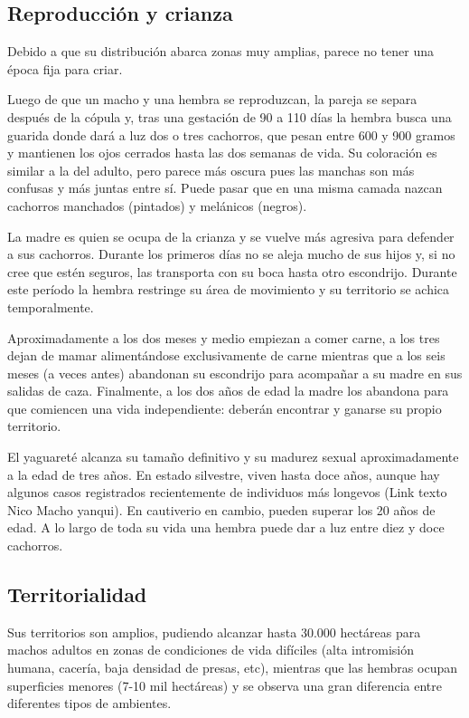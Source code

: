 \documentclass{article}
\begin{document}
    \subsection{Reproducción y crianza}
    Debido a que su distribución abarca zonas muy amplias, parece no tener una época fija para criar.
    
    Luego de que un macho y una hembra se reproduzcan, la pareja se separa después de la cópula y, tras una gestación de 90 a 110 días la hembra busca una guarida donde dará a luz dos o tres cachorros, que pesan entre 600 y 900 gramos y mantienen los ojos cerrados hasta las dos semanas de vida. Su coloración es similar a la del adulto, pero parece más oscura pues las manchas son más confusas y más juntas entre sí. Puede pasar que en una misma camada nazcan cachorros manchados (pintados) y melánicos (negros).
    
    La madre es quien se ocupa de la crianza y se vuelve más agresiva para defender a sus cachorros. Durante los primeros días no se aleja mucho de sus hijos y, si no cree que estén seguros, las transporta con su boca hasta otro escondrijo. Durante este período la hembra restringe su área de movimiento y su territorio se achica temporalmente.
    
    Aproximadamente a los dos meses y medio empiezan a comer carne, a los tres dejan de mamar alimentándose exclusivamente de carne mientras que a los seis meses (a veces antes) abandonan su escondrijo para acompañar a su madre en sus salidas de caza. Finalmente, a los dos años de edad la madre los abandona para que comiencen una vida independiente: deberán encontrar y ganarse su propio territorio.
    
    El yaguareté alcanza su tamaño definitivo y su madurez sexual aproximadamente a la edad de tres años. En estado silvestre, viven hasta doce años, aunque hay algunos casos registrados recientemente de individuos más longevos (Link texto Nico Macho yanqui). En cautiverio en cambio, pueden superar los 20 años de edad. A lo largo de toda su vida una hembra puede dar a luz entre diez y doce cachorros.

    \subsection{Territorialidad}
    Sus territorios son amplios, pudiendo alcanzar hasta 30.000 hectáreas para machos adultos en zonas de condiciones de vida difíciles (alta intromisión humana, cacería, baja densidad de presas, etc), mientras que las hembras ocupan superficies menores (7-10 mil hectáreas) y se observa una gran diferencia entre diferentes tipos de ambientes.
    
\end{document}

